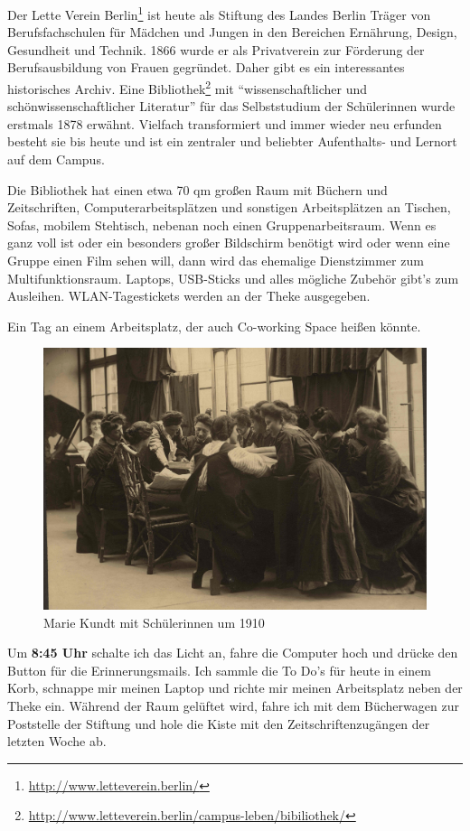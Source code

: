 \documentclass[a4paper,
fontsize=11pt,
oneside,
numbers=noperiodatend,
parskip=half-,
bibliography=totoc,
final
]{scrartcl}
\begin{document}
Der Lette Verein Berlin\footnote{\url{http://www.letteverein.berlin/}}
ist heute als Stiftung des Landes Berlin Träger von Berufsfachschulen
für Mädchen und Jungen in den Bereichen Ernährung, Design, Gesundheit
und Technik. 1866 wurde er als Privatverein zur Förderung der
Berufsausbildung von Frauen gegründet. Daher gibt es ein interessantes
historisches Archiv. Eine Bibliothek\footnote{\url{http://www.letteverein.berlin/campus-leben/bibiliothek/}}
mit \enquote{wissenschaftlicher und schönwissenschaftlicher Literatur}
für das Selbststudium der Schülerinnen wurde erstmals 1878 erwähnt.
Vielfach transformiert und immer wieder neu erfunden besteht sie bis
heute und ist ein zentraler und beliebter Aufenthalts- und Lernort auf
dem Campus.

Die Bibliothek hat einen etwa 70 qm großen Raum mit Büchern und
Zeitschriften, Computerarbeitsplätzen und sonstigen Arbeitsplätzen an
Tischen, Sofas, mobilem Stehtisch, nebenan noch einen
Gruppenarbeitsraum. Wenn es ganz voll ist oder ein besonders großer
Bildschirm benötigt wird oder wenn eine Gruppe einen Film sehen will,
dann wird das ehemalige Dienstzimmer zum Multifunktionsraum. Laptops,
USB-Sticks und alles mögliche Zubehör gibt's zum Ausleihen.
WLAN-Tagestickets werden an der Theke ausgegeben.

Ein Tag an einem Arbeitsplatz, der auch Co-working Space heißen könnte.

\begin{figure}
\centering
\includegraphics{img/archiv.jpg}
\caption{Marie Kundt mit Schülerinnen um 1910}
\end{figure}

Um \textbf{8:45 Uhr} schalte ich das Licht an, fahre die Computer hoch
und drücke den Button für die Erinnerungsmails. Ich sammle die To Do's
für heute in einem Korb, schnappe mir meinen Laptop und richte mir
meinen Arbeitsplatz neben der Theke ein. Während der Raum gelüftet wird,
fahre ich mit dem Bücherwagen zur Poststelle der Stiftung und hole die
Kiste mit den Zeitschriftenzugängen der letzten Woche ab.
\end{document}
